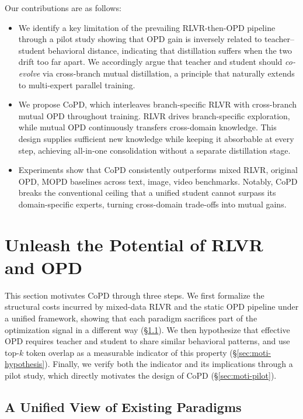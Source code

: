\documentclass{llmxive}
\begin{document}
Our contributions are as follows:
\begin{itemize}
    \item We identify a key limitation of the prevailing RLVR-then-OPD pipeline through a pilot study showing that OPD gain is inversely related to teacher--student behavioral distance, indicating that distillation suffers when the two drift too far apart. We accordingly argue that teacher and student should \textit{co-evolve} via cross-branch mutual distillation, a principle that naturally extends to multi-expert parallel training.
    \item We propose CoPD, which interleaves branch-specific RLVR with cross-branch mutual OPD throughout training. RLVR drives branch-specific exploration, while mutual OPD continuously transfers cross-domain knowledge. This design supplies sufficient new knowledge while keeping it absorbable at every step, achieving all-in-one consolidation without a separate distillation stage.
    \item Experiments show that CoPD consistently outperforms mixed RLVR, original OPD, MOPD baselines across text, image, video benchmarks. Notably, CoPD breaks the conventional ceiling that a unified student cannot surpass its domain-specific experts, turning cross-domain trade-offs into mutual gains.
\end{itemize}





\section{Unleash the Potential of RLVR and OPD}
\label{sec:motivation}


This section motivates CoPD through three steps. We first formalize the structural costs incurred by mixed-data RLVR and the static OPD pipeline under a unified framework, showing that each paradigm sacrifices part of the optimization signal in a different way (\S\ref{sec:moti-analysis}). We then hypothesize that effective OPD requires teacher and student to share similar behavioral patterns, and use top-$k$ token overlap as a measurable indicator of this property (\S\ref{sec:moti-hypothesis}). Finally, we verify both the indicator and its implications through a pilot study, which directly motivates the design of CoPD (\S\ref{sec:moti-pilot}).

\subsection{A Unified View of Existing Paradigms}
\label{sec:moti-analysis}
\end{document}
